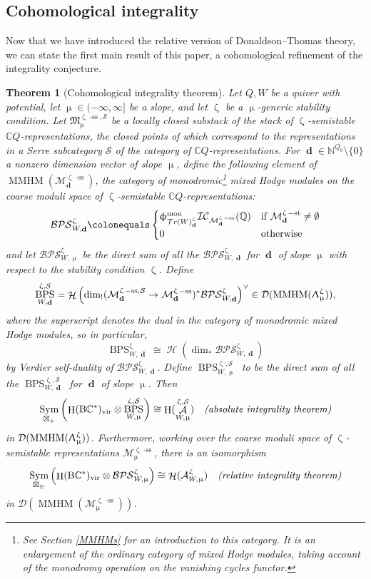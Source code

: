 \documentclass[a4paper,10pt]{amsart}
\renewcommand{\zeta}{\upzeta}
\renewcommand{\Lambda}{\Uplambda}
\renewcommand{\phi}{\upphi}
\renewcommand{\mu}{\upmu}
\newtheorem{thmx}{Theorem}
\DeclareMathOperator{\BC}{B\mathbb{C}^*}
\newcommand{\SP}{\mathcal{S}}
\newcommand{\WW}{\mathcal{T}r(W)}
\newcommand{\Mst}{\mathfrak{M}}
\newcommand{\Msp}{\mathcal{M}}
\newcommand{\ICS}{\mathcal{IC}}
\newcommand{\DTS}{\mathcal{BPS}}
\newcommand{\phim}[1]{\phi^{\mon}_{#1}}
\DeclareMathOperator{\sst}{-ss}
\DeclareMathOperator{\st}{-st}
\DeclareMathOperator{\FreeComm}{Sym}
\DeclareMathOperator{\mon}{mon}
\DeclareMathOperator{\MMHM}{MMHM}
\DeclareMathOperator{\dd}{\mathbf{d}}
\DeclareMathOperator{\DT}{BPS}
\DeclareMathOperator{\Sym}{Sym}
\DeclareMathOperator{\vir}{vir}
\DeclareMathOperator{\Ho}{\mathcal{H}}
\DeclareMathOperator{\HO}{H}
\DeclareMathOperator{\Coha}{\mathcal{A}}
\newcommand{\Dub}{\mathcal{D}}
\begin{document}
\subsection{Cohomological integrality}
Now that we have introduced the relative version of Donaldson--Thomas theory, we can state the first main result of this paper, a cohomological refinement of the integrality conjecture.
\begin{thmx}[Cohomological integrality theorem]
\label{ThmA}
Let $Q,W$ be a quiver with potential, let $\mu\in (-\infty,\infty]$ be a slope, and let $\zeta$ be a $\mu$-generic stability condition.  Let $\Mst^{\zeta\sst,\SP}_{\mu}$ be a locally closed substack of the stack of $\zeta$-semistable $\mathbb{C}Q$-representations, the closed points of which correspond to the representations in a Serre subcategory $\SP$ of the category of $\mathbb{C}Q$-representations.  For $\dd\in\mathbb{N}^{Q_0}\setminus\{0\}$ a nonzero dimension vector of slope $\mu$, define the following element of $\MMHM(\Msp^{\zeta\sst}_{\dd})$, the category of monodromic\footnote{See Section \ref{MMHMs} for an introduction to this category.  It is an enlargement of the ordinary category of mixed Hodge modules, taking account of the monodromy operation on the vanishing cycles functor.} mixed Hodge modules on the coarse moduli space of $\zeta$-semistable $\mathbb{C}Q$-representations:
\[
\DTS_{W,\dd}^{\zeta}\colonequals \begin{cases}\phim{\WW^\zeta_{\dd}}\ICS_{\Msp^{\zeta\sst}_{\dd}}(\mathbb{Q})&\textrm{if  }\Msp^{\zeta\st}_{\dd}\neq\emptyset \\0&\textrm{otherwise}\end{cases}
\]
and let $\DTS^{\zeta}_{W,\mu}$ be the direct sum of all the $\DTS_{W,\dd}^{\zeta}$ for $\dd$ of slope $\mu$ with respect to the stability condition $\zeta$.  Define 
\[
\DT_{W,\dd}^{\zeta,\SP}=\Ho\left(\dim_!(\Msp^{\zeta\sst,\SP}_{\dd}\rightarrow \Msp^{\zeta\sst}_{\dd})^*\DTS_{W,\dd}^{\zeta}\right)^{\vee}\in\Dub(\MMHM(\Lambda_{\mu}^{\zeta})),
\]
where the superscript denotes the dual in the category of monodromic mixed Hodge modules, so in particular,
\[
\DT_{W,\dd}^{\zeta}\cong \Ho\left(\dim_*\DTS_{W,\dd}^{\zeta}\right)
\]
by Verdier self-duality of $\DTS_{W,\dd}^{\zeta}$.  Define $\DT_{W,\mu}^{\zeta,\SP}$ to be the direct sum of all the $\DT_{W,\dd}^{\zeta,\SP}$ for $\dd$ of slope $\mu$.  Then
\begin{align*}
\FreeComm_{\boxtimes_+}\left(\HO(\BC)_{\vir}\otimes \DT_{W,\mu}^{\zeta,\SP}\right)\cong \HO(\Coha^{\zeta,\SP}_{W,\mu}) &&\emph{(absolute integrality theorem)}
\end{align*}
in $\Dub(\MMHM(\Lambda_{\mu}^{\zeta}))$.  Furthermore, working over the coarse moduli space of $\zeta$-semistable representations $\Msp_{\mu}^{\zeta\sst}$, there is an isomorphism 
\begin{align*}
\Sym_{\boxtimes_{\oplus}}\left(\HO(\BC)_{\vir}\otimes\DTS_{W,\mu}^{\zeta}\right)\cong\Ho(\mathcal{A}_{W,\mu}^{\zeta})&&\emph{(relative integrality theorem)}
\end{align*}
in $\Dub(\MMHM(\Msp^{\zeta\sst}_{\mu}))$.
\end{thmx}
\end{document}
